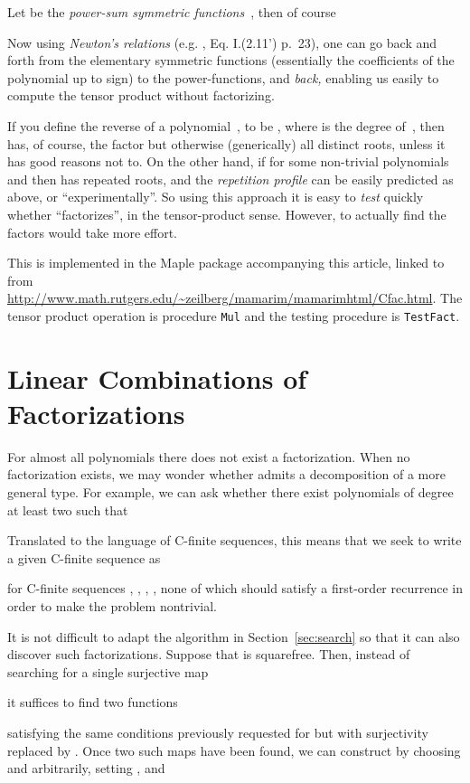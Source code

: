 \documentclass{sig-alternate}
\begin{document}
Let  be the {\it power-sum symmetric functions}~\cite{macdonald95}, then of course

Now using {\it Newton's relations} (e.g. \cite{macdonald95}, Eq. I.(2.11') p.~23), one can go back and forth from
the elementary symmetric functions (essentially the coefficients of the polynomial up to sign) to the power-functions,
and {\it back,} enabling us easily to compute the tensor product without factorizing.

If you define the reverse of a polynomial~, to be , where  is the degree of~,
then  has, of course, the factor  but otherwise (generically) all distinct roots,
unless it has good reasons not to.
On the other hand, if  for some non-trivial polynomials  and  then   has repeated roots,
and the {\it repetition profile} can be easily predicted as above, or ``experimentally''. So using
this approach it is easy to {\it test} quickly whether  ``factorizes'', in the tensor-product sense.
However, to actually find the factors would take more effort.

This is implemented in the Maple package accompanying this article, linked to from
\url{http://www.math.rutgers.edu/~zeilberg/mamarim/mamarimhtml/Cfac.html}.
The tensor product operation is procedure {\tt Mul} and the testing procedure is {\tt TestFact}.

\section{Linear Combinations of Factorizations}

For almost all polynomials  there does not exist a factorization.
When no factorization exists, we may wonder whether  admits a decomposition of
a more general type. For example, we can ask whether there exist polynomials
 of degree at least two such that

Translated to the language of C-finite sequences, this means that we seek to write
a given C-finite sequence  as

for C-finite sequences , ,
, , none of which should satisfy a first-order
recurrence in order to make the problem nontrivial.

\def\im{\operatorname{im}}
It is not difficult to adapt the algorithm in Section~\ref{sec:search}
so that it can also discover such factorizations.
Suppose that  is squarefree. Then, instead of searching for 
a single surjective map

it suffices to find two functions

satisfying the same conditions previously requested for  but with surjectivity replaced by
. Once two such maps  have been found,
we can construct  by choosing  and  arbitrarily,
setting ,  and
\end{document}
